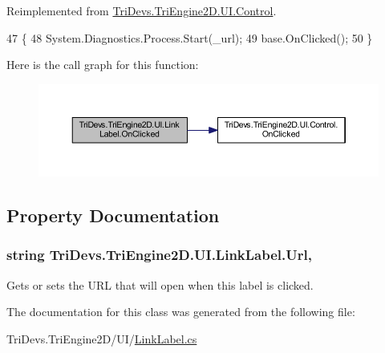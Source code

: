 Reimplemented from \hyperlink{class_tri_devs_1_1_tri_engine2_d_1_1_u_i_1_1_control_aa5d2b95535bb697420b640e5db72bc48}{Tri\-Devs.\-Tri\-Engine2\-D.\-U\-I.\-Control}.


\begin{DoxyCode}
47         \{
48             System.Diagnostics.Process.Start(\_url);
49             base.OnClicked();
50         \}
\end{DoxyCode}


Here is the call graph for this function\-:
\nopagebreak
\begin{figure}[H]
\begin{center}
\leavevmode
\includegraphics[width=350pt]{class_tri_devs_1_1_tri_engine2_d_1_1_u_i_1_1_link_label_adcc511e03ec0c880cdff37947178a756_cgraph}
\end{center}
\end{figure}




\subsection{Property Documentation}
\hypertarget{class_tri_devs_1_1_tri_engine2_d_1_1_u_i_1_1_link_label_ad05f4d55ad4c170752367321a4a4837f}{
\subsubsection[{Url}]{\setlength{\rightskip}{0pt plus 5cm}string Tri\-Devs.\-Tri\-Engine2\-D.\-U\-I.\-Link\-Label.\-Url\hspace{0.3cm}{\ttfamily [get]}, {\ttfamily [set]}}}\label{class_tri_devs_1_1_tri_engine2_d_1_1_u_i_1_1_link_label_ad05f4d55ad4c170752367321a4a4837f}


Gets or sets the U\-R\-L that will open when this label is clicked. 



The documentation for this class was generated from the following file\-:\begin{DoxyCompactItemize}
\item 
Tri\-Devs.\-Tri\-Engine2\-D/\-U\-I/\hyperlink{_link_label_8cs}{Link\-Label.\-cs}\end{DoxyCompactItemize}
